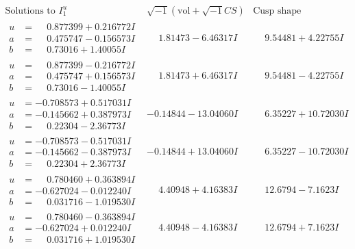 \documentclass[1p]{elsarticle_modified}
\theoremstyle{definition}
\newcommand{\I}{\sqrt{-1}}
\begin{document}
$$\begin{array}{c|c|c}  
\text{Solutions to }I^u_{1}& \I (\text{vol} + \sqrt{-1}CS) & \text{Cusp shape}\\
 \hline 
\begin{aligned}
u &= \phantom{-}0.877399 + 0.216772 I \\
a &= \phantom{-}0.475747 - 0.156573 I \\
b &= \phantom{-}0.73016 + 1.40055 I\end{aligned}
 & \phantom{-}1.81473 - 6.46317 I & \phantom{-}9.54481 + 4.22755 I \\ \hline\begin{aligned}
u &= \phantom{-}0.877399 - 0.216772 I \\
a &= \phantom{-}0.475747 + 0.156573 I \\
b &= \phantom{-}0.73016 - 1.40055 I\end{aligned}
 & \phantom{-}1.81473 + 6.46317 I & \phantom{-}9.54481 - 4.22755 I \\ \hline\begin{aligned}
u &= -0.708573 + 0.517031 I \\
a &= -0.145662 + 0.387973 I \\
b &= \phantom{-}0.22304 - 2.36773 I\end{aligned}
 & -0.14844 - 13.04060 I & \phantom{-}6.35227 + 10.72030 I \\ \hline\begin{aligned}
u &= -0.708573 - 0.517031 I \\
a &= -0.145662 - 0.387973 I \\
b &= \phantom{-}0.22304 + 2.36773 I\end{aligned}
 & -0.14844 + 13.04060 I & \phantom{-}6.35227 - 10.72030 I \\ \hline\begin{aligned}
u &= \phantom{-}0.780460 + 0.363894 I \\
a &= -0.627024 - 0.012240 I \\
b &= \phantom{-}0.031716 - 1.019530 I\end{aligned}
 & \phantom{-}4.40948 + 4.16383 I & \phantom{-}12.6794 - 7.1623 I \\ \hline\begin{aligned}
u &= \phantom{-}0.780460 - 0.363894 I \\
a &= -0.627024 + 0.012240 I \\
b &= \phantom{-}0.031716 + 1.019530 I\end{aligned}
 & \phantom{-}4.40948 - 4.16383 I & \phantom{-}12.6794 + 7.1623 I \\ \hline\begin{aligned}

\end{aligned}
\end{array}$$
\end{document}

